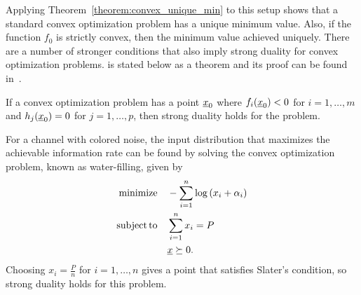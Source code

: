 Applying Theorem~\ref{theorem:convex_unique_min} to this setup shows that a standard convex optimization problem has a unique minimum value.
Also, if the function $f_0$ is strictly convex, then the minimum value achieved uniquely.
There are a number of stronger conditions that also imply strong duality for convex optimization problems.
 is stated below as a theorem and its proof can be found in~\cite[Sec.~5.3.2]{Boyd-2004}.
 
\begin{theorem}
If a convex optimization problem has a point $\underline{x}_0$ where $f_i(\underline{x}_0) < 0$ for $i=1,\ldots,m$ and $h_j (\underline{x}_0) = 0$ for $j=1,\ldots,p$, then strong duality holds for the problem.
\end{theorem}


\begin{example}
For a channel with colored noise, the input distribution that maximizes the achievable information rate can be found by solving the convex optimization problem, known as water-filling, given by
\begin{align*}
\mathrm{minimize} \quad & -\sum_{i=1}^n \log \left( x_i + \alpha_i \right) \\
\mathrm{subject\,to} \quad & \sum_{i=1}^n x_i = P \\
& \underline{x} \succeq 0.
\end{align*}
Choosing $x_i = \frac{P}{n}$ for $i=1,\ldots,n$ gives a point that satisfies Slater's condition, so strong duality holds for this problem.
\end{example}

